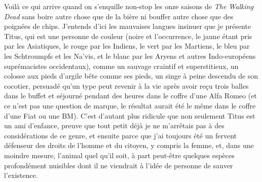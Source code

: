 Voilà ce qui arrive quand on s’enquille non-stop les onze saisons de \textit{The Walking Dead} sans boire autre chose que de la bière ni bouffer autre chose que des poignées de chips. J’entends d’ici les mauvaises langues insinuer que je présente Titus, qui est une personne de couleur (noire et l’occurrence, le jaune étant pris par les Asiatiques, le rouge par les Indiens, le vert par les Martiens, le bleu par les Schtroumpfs et les Na’vis, et le blanc par les Aryens et autres Indo-européens suprémacistes occidentaux), comme un sauvage craintif et superstitieux, un colosse aux pieds d’argile bête comme ses pieds, un singe à peine descendu de son cocotier, persuadé qu’un type peut revenir à la vie après avoir reçu trois balles dans le buffet et séjourné pendant des heures dans le coffre d’une Alfa Romeo (et ce n’est pas une question de marque, le résultat aurait été le même dans le coffre d’une Fiat ou une BM). C’est d’autant plus ridicule que non seulement Titus est un ami d’enfance, preuve que tout petit déjà je ne m’arrêtais pas à des considérations de ce genre, et ensuite parce que j’ai toujours été un fervent défenseur des droits de l’homme et du citoyen, y compris la femme, et, dans une moindre mesure, l’animal quel qu’il soit, à part peut-être quelques espèces profondément nuisibles dont il ne viendrait à l’idée de personne de sauver l’existence.

